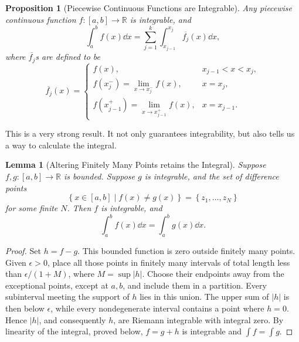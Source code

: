 \documentclass[11pt]{article}
\numberwithin{equation}{section}
\newtheorem{lemma}[theorem]{Lemma}
\newtheorem{proposition}[theorem]{Proposition}
\theoremstyle{definition}
\theoremstyle{remark}
\newcommand{\pqty}[1]{\left(#1\right)}
\newcommand{\Bqty}[1]{\left\{#1\right\}}
\newcommand{\set}[2]{\left\{#1\mid #2\right\}}
\newcommand{\ccintv}[2]{[#1,#2]}
\newcommand{\functiondomain}[3]{#1:#2\to #3}
\newcommand{\RR}{\mathbb R}
\begin{document}
\begin{proposition}[Piecewise Continuous Functions are Integrable]\label{analysis-unit-0153}
    \label{prop:piecewise-continuous-integrable}%
    Any piecewise continuous function \(\functiondomain{f}{\ccintv{a}{b}}{\RR}\) is integrable, and
    \[
        \int_{a}^{b} f\pqty{x} \dd{x} = \sum_{j = 1}^{k} \int_{x_{j - 1}}^{x_j} \overline{f_j} \pqty{x} \dd{x},
    \]
    where \(\overline{f_j}\)s are defined to be
    \[
        \overline{f_j} \pqty{x} = \begin{cases}
            f\pqty{x}, & x_{j - 1} < x < x_j, \\
            f\pqty{x_j^{-}} = \lim_{x \to x_j^{-}} f\pqty{x}, & x = x_j, \\
            f\pqty{x_{j - 1}^{+}} = \lim_{x \to x_{j - 1}^{+}} f\pqty{x}, & x = x_{j - 1}.
        \end{cases}
    \]
\end{proposition}

This is a very strong result. It not only guarantees integrability, but also tells us a way to calculate the integral.

\begin{lemma}[Altering Finitely Many Points retains the Integral]\label{analysis-unit-0154}
    \label{lem:individual-points-retains-integrable}%
    Suppose \(\functiondomain{f, g}{\ccintv{a}{b}}{\RR}\) is bounded. Suppose \(g\) is integrable, and the set of difference points
    \[
        \set{x \in \ccintv{a}{b}}{f\pqty{x} \neq g\pqty{x}} = \Bqty{z_1, \ldots, z_N}
    \]
    for some finite \(N\). Then \(f\) is integrable, and
    \[
        \int_{a}^{b} f\pqty{x} \dd{x} = \int_{a}^{b} g\pqty{x} \dd{x}.
    \]
\end{lemma}

\begin{proof}
Set \(h=f-g\). This bounded function is zero outside finitely many points.
Given \(\epsilon>0\), place all those points in finitely many intervals of total
length less than \(\epsilon/(1+M)\), where \(M=\sup|h|\). Choose their endpoints
away from the exceptional points, except at \(a,b\), and include them in a partition.
Every subinterval meeting the support of \(h\) lies in this union. The upper sum
of \(|h|\) is then below \(\epsilon\), while every nondegenerate interval contains
a point where \(h=0\). Hence \(|h|\), and consequently \(h\), are Riemann integrable
with integral zero. By linearity of the integral, proved below,
\(f=g+h\) is integrable and \(\int f=\int g\).
\end{proof}
\end{document}

